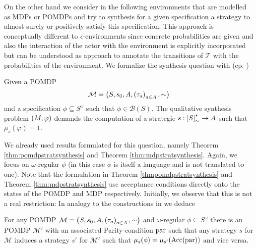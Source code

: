 On the other hand we consider in the following environments that are modelled 
as \acp{MDP} or \acp{POMDP} and try to synthesis for a given specification a 
strategy to almost-surely or positively satisfy this specification. This 
approach is conceptually different to $\epsilon$-environments since concrete 
probabilities are given and also the interaction of the actor with the 
environment is explicitly incorporated but can be understood as approach to 
annotate the transitions of $\mathcal{T}$ with the probabilities of the 
environment. We formalize the synthesis question with (cp. 
\cite{QualAnaPOMDP,SimpleStochasticParityGames,ComplexProbVerification})
\begin{definition}
  Given a \ac{POMDP} 
  \begin{equation*}
    \mathcal{M} = \left(S, s_{0}, A, \left(\tau_{a}\right)_{a\in A}, \sim\right)
  \end{equation*}
  and a specification $\phi\subseteq S^{\omega}$ such that 
  $\phi\in\mathcal{B}(S)$. The qualitative synthesis problem 
  $\left(M, \varphi\right)$ demands the computation of a strategie 
  $s:\left[S\right]_{\sim}^{*}\rightarrow A$ such that $\mu_{s}(\varphi) = 1$.
\end{definition}
We already used results formulated for this question, namely Theorem 
\ref{thm:pomdpstratsynthesis} and Theorem \ref{thm:mdpstratsynthesis}. Again,
we focus on $\omega$-regular $\phi$ (in this case $\phi$ is itself a language
and is not translated to one). Note that the formulation in Theorem 
\ref{thmpomdpstratsynthesis} and Theorem \ref{thm:mdpstratsynthesis} use 
acceptance conditions directly onto the states of the \ac{POMDP} and \ac{MDP}
respectively. Initially, we observe that this is not a real restriction:
In analogy to the constructions in
\cite{ComplexProbVerification,MDPandRegEvents} we deduce
\begin{lemma}
  For any \ac{POMDP} $\mathcal{M} = \left(S, s_{0}, A, 
  \left(\tau_{a}\right)_{a\in A}, \sim\right)$ and $\omega$-regular 
  $\phi\subseteq S^{\omega}$ there is an \ac{POMDP} $\mathcal{M'}$ with an 
  associated Parity-condition $\operatorname{par}$ such that any strategy $s$ for 
  $\mathcal{M}$ induces a strategy $s'$ for $\mathcal{M'}$ such that 
  $\mu_{s}(\phi) = \mu_{s'}(\operatorname{Acc}(\operatorname{par}))$ and vice versa.
  \label{lem:POMDPomegareg}
\end{lemma}
